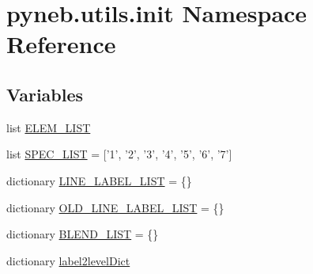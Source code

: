 \hypertarget{namespacepyneb_1_1utils_1_1init}{\section{pyneb.\-utils.\-init Namespace Reference}
\label{namespacepyneb_1_1utils_1_1init}
}
\subsection*{Variables}
\begin{DoxyCompactItemize}
\item 
list \hyperlink{namespacepyneb_1_1utils_1_1init_af5a11a312a4ec31ace89027a644a39f2}{E\-L\-E\-M\-\_\-\-L\-I\-S\-T}
\item 
list \hyperlink{namespacepyneb_1_1utils_1_1init_a47360d2d66e5f0a81989d968227cd259}{S\-P\-E\-C\-\_\-\-L\-I\-S\-T} = \mbox{[}'1', '2', '3', '4', '5', '6', '7'\mbox{]}
\item 
dictionary \hyperlink{namespacepyneb_1_1utils_1_1init_a2819312869609a6e39b7c8ebd4d1e718}{L\-I\-N\-E\-\_\-\-L\-A\-B\-E\-L\-\_\-\-L\-I\-S\-T} = \{\}
\item 
dictionary \hyperlink{namespacepyneb_1_1utils_1_1init_a73f9a0a6cbae574488d50a7af6fbfa1d}{O\-L\-D\-\_\-\-L\-I\-N\-E\-\_\-\-L\-A\-B\-E\-L\-\_\-\-L\-I\-S\-T} = \{\}
\item 
dictionary \hyperlink{namespacepyneb_1_1utils_1_1init_ad9b77c5e4538ba2dda2b28727b3b01d7}{B\-L\-E\-N\-D\-\_\-\-L\-I\-S\-T} = \{\}
\item 
dictionary \hyperlink{namespacepyneb_1_1utils_1_1init_a4095c9ea31cb082d2a7edae4b74bd55b}{label2level\-Dict}
\end{DoxyCompactItemize}


